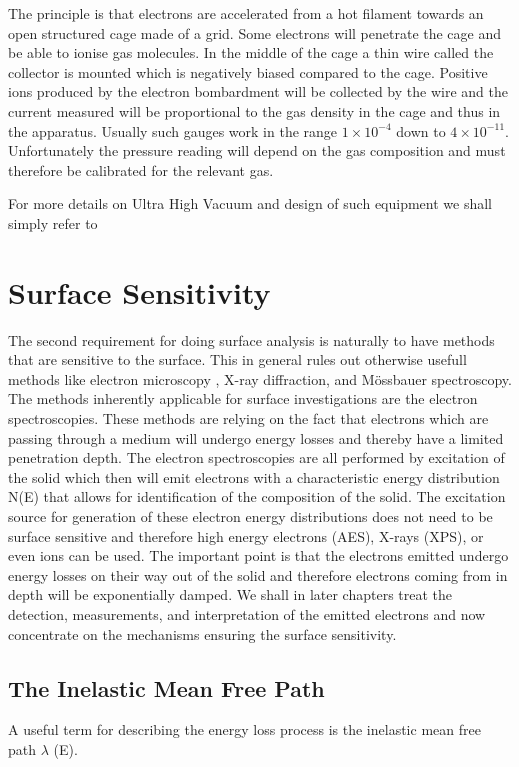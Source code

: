 The principle is that electrons are accelerated from a hot filament towards an open structured cage made of a grid. Some electrons will penetrate the cage and be able to ionise gas molecules. In the middle of the cage a thin wire called the collector is mounted which is negatively biased compared to the cage. Positive ions produced by the electron bombardment will be collected by the wire and the current measured will be proportional to the gas density in the cage and thus in the apparatus. Usually such gauges work in the range $1 \times 10^{-4}$ down to $4 \times 10^{-11}$. Unfortunately the pressure reading will depend on the gas composition and must therefore be calibrated for the relevant gas.

For more details on Ultra High Vacuum and design of such equipment we shall simply refer to \cite{roth}

\section{Surface Sensitivity}
The second requirement for doing surface analysis is naturally to have methods that are sensitive to the surface. This in general rules out otherwise usefull methods like electron microscopy , X-ray diffraction, and M\"{o}ssbauer spectroscopy. The methods inherently applicable for surface investigations are the electron spectroscopies. These methods are relying on the fact that electrons which are passing through a medium will undergo energy losses and thereby have a limited penetration depth. The electron spectroscopies are all performed by excitation of the solid which then will emit electrons with a characteristic energy distribution N(E) that allows for identification of the composition of the solid. The excitation source for generation of these electron energy distributions does not need to be surface sensitive and therefore high energy electrons (AES), X-rays (XPS), or even ions can be used. The important point is that the electrons emitted undergo energy losses on their way out of the solid and therefore electrons coming from in depth will be exponentially damped. We shall in later chapters treat the detection, measurements, and interpretation of the emitted electrons and now concentrate on the mechanisms ensuring the surface sensitivity.

\subsection{The Inelastic Mean Free Path}
A useful term for describing the energy loss process is the inelastic mean free path $\lambda$ (E).

